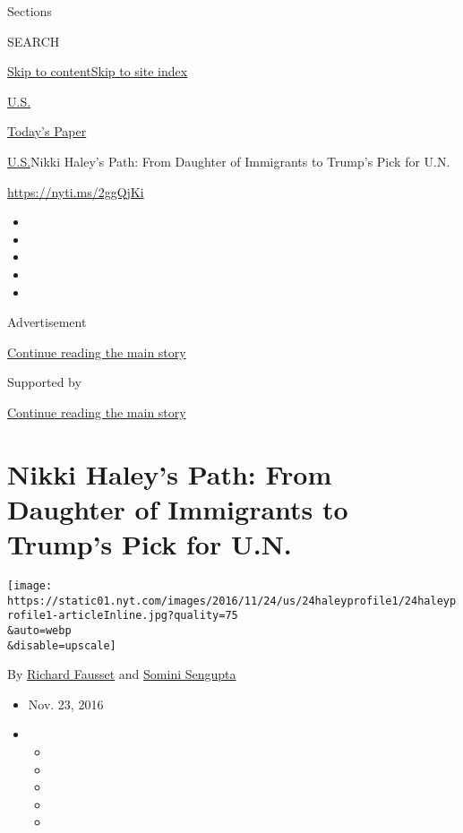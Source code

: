 Sections

SEARCH

\protect\hyperlink{site-content}{Skip to
content}\protect\hyperlink{site-index}{Skip to site index}

\href{https://www.nytimes.com/section/us}{U.S.}

\href{https://myaccount.nytimes.com/auth/login?response_type=cookie\&client_id=vi}{}

\href{https://www.nytimes.com/section/todayspaper}{Today's Paper}

\href{/section/us}{U.S.}\textbar{}Nikki Haley's Path: From Daughter of
Immigrants to Trump's Pick for U.N.

\url{https://nyti.ms/2ggQjKi}

\begin{itemize}
\item
\item
\item
\item
\item
\end{itemize}

Advertisement

\protect\hyperlink{after-top}{Continue reading the main story}

Supported by

\protect\hyperlink{after-sponsor}{Continue reading the main story}

\hypertarget{nikki-haleys-path-from-daughter-of-immigrants-to-trumps-pick-for-un}{%
\section{Nikki Haley's Path: From Daughter of Immigrants to Trump's Pick
for
U.N.}\label{nikki-haleys-path-from-daughter-of-immigrants-to-trumps-pick-for-un}}

\texttt{[image: https://static01.nyt.com/images/2016/11/24/us/24haleyprofile1/24haleyprofile1-articleInline.jpg?quality=75\\\&auto=webp\\\&disable=upscale]}

By \href{https://www.nytimes.com/by/richard-fausset}{Richard Fausset}
and \href{http://www.nytimes.com/by/somini-sengupta}{Somini Sengupta}

\begin{itemize}
\item
  Nov. 23, 2016
\item
  \begin{itemize}
  \item
  \item
  \item
  \item
  \item
  \end{itemize}
\end{itemize}

